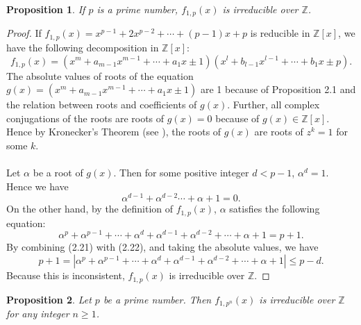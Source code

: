 \documentclass{article}
\newtheorem{prop}{Proposition}[section]
\begin{document}

\begin{prop}
\upshape
If $p$ is a prime number, $f_{1,p}(x)$ is irreducible over $\mathbb{Z}$.
\end{prop}

\begin{proof}
If $f_{1,p}(x)=x^{p-1}+2x^{p-2}+\cdots +(p-1)x+p$ is reducible in $\mathbb{Z}[x]$, we have the following decomposition in $\mathbb{Z}[x]$:
\begin{equation}
f_{1,p}(x)=(x^{m}+a_{m-1}x^{m-1}+\cdots +a_{1}x\pm 1)(x^{l}+b_{l-1}x^{l-1}+\cdots +b_{1}x\pm p).
\end{equation}
The absolute values of roots of the equation $g(x)=(x^{m}+a_{m-1}x^{m-1}+\cdots +a_{1}x\pm 1)$ are 1 because of Proposition 2.1 and the relation between roots and coefficients of $g(x)$. Further, all complex conjugations of the roots are roots of $g(x)=0$ because of $g(x)\in \mathbb{Z}[x]$. Hence by Kronecker's Theorem (see \cite{Kronecker}), the roots of $g(x)$ are roots of $z^{k}=1$ for some $k$.\\
\\
Let $\alpha$ be a root of $g(x)$. Then for some positive integer $d<p-1$, $\alpha^{d}=1$. Hence we have
\begin{equation}
\alpha^{d-1}+\alpha^{d-2}\cdots +\alpha+1=0.
\end{equation}
On the other hand, by the definition of $f_{1,p}(x)$, $\alpha$ satisfies the following equation:
\begin{equation}
\alpha^{p}+\alpha^{p-1}+\cdots + \alpha^{d}+\alpha^{d-1}+\alpha^{d-2}+\cdots +\alpha+1=p+1.
\end{equation}
By combining (2.21) with (2.22), and taking the absolute values, we have
\begin{equation}
p+1=|\alpha^{p}+\alpha^{p-1}+\cdots + \alpha^{d}+\alpha^{d-1}+\alpha^{d-2}+\cdots +\alpha+1|\leq p-d.
\end{equation}
Because this is inconsistent, $f_{1,p}(x)$ is irreducible over $\mathbb{Z}$.

\end{proof}


\begin{prop}
\upshape
Let $p$ be a prime number. Then $f_{1,p^{n}}(x)$ is irreducible over $\mathbb{Z}$ for any integer $n\geq1$.
\end{prop}
\end{document}
